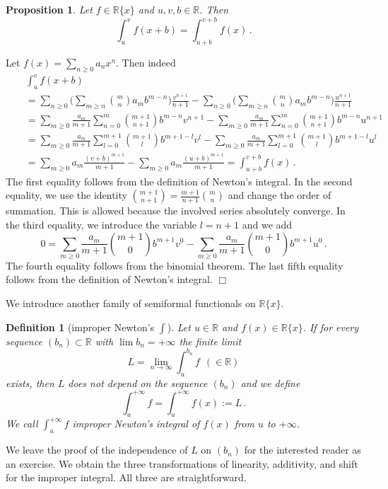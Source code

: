 \documentclass[10pt]{article}
\def\R{\mathbb{R}}
\def\proof{\par\noindent{\em Proof. }}
\def\eproof{\hfill{$\Box$}\bigskip}
\def\sus{\subset}
\newtheorem{prop}[thm]{Proposition}
\newtheorem{defi}[thm]{Definition}
\begin{document}
\begin{prop}\label{prop_shifInte3}
Let $f\in\R\{x\}$ and $u,v,b\in\R$. Then
$${\textstyle
\int_u^v f(x+b)=\int_{u+b}^{v+b} f(x)\,.
}
$$
\end{prop}
\proof
Let $f(x)=\sum_{n\ge0}a_nx^n$. Then indeed
\begin{eqnarray*}
&&{\textstyle
\int_u^v f(x+b)}\\
&&{\textstyle
=\sum_{n\ge0}\big(\sum_{m\ge n}\binom{m}{n}a_mb^{m-n}\big)\frac{v^{n+1}}{n+1}-\sum_{n\ge0}\big(\sum_{m\ge n}\binom{m}{n}a_mb^{m-n}\big)\frac{u^{n+1}}{n+1}}\\
&&={\textstyle
\sum_{m\ge0}\frac{a_m}{m+1}\sum_{n=0}^m\binom{m+1}{n+1}b^{m-n}v^{n+1}-
\sum_{m\ge0}\frac{a_m}{m+1}\sum_{n=0}^m\binom{m+1}{n+1}b^{m-n}u^{n+1}}\\
&&{\textstyle
=\sum_{m\ge0}\frac{a_m}{m+1}\sum_{l=0}^{m+1}\binom{m+1}{l}b^{m+1-l}v^l-
\sum_{m\ge0}\frac{a_m}{m+1}\sum_{l=0}^{m+1}\binom{m+1}{l}b^{m+1-l}u^l}\\
&&{\textstyle
=\sum_{m\ge0}a_m\frac{(v+b)^{m+1}}{m+1}-\sum_{m\ge0}a_m\frac{(u+b)^{m+1}}{m+1}=\int_{u+b}^{v+b} f(x)\,.}
\end{eqnarray*}
The first equality follows from the definition of Newton's integral. In 
the second equality, we use the identity $\binom{m+1}{n+1}=
\frac{m+1}{n+1}\binom{m}{n}$ and change the order of summation. This is
allowed because the involved series absolutely converge. In the third 
equality, we introduce the variable $l=n+1$ and we add  
$$
{\textstyle
0=\sum_{m\ge0}\frac{a_m}{m+1}\binom{m+1}{0}b^{m+1}v^0-
\sum_{m\ge0}\frac{a_m}{m+1}\binom{m+1}{0}b^{m+1}u^0\,.
}
$$  
The fourth equality follows from the binomial theorem. The last fifth 
equality follows from the definition of Newton's integral. 
\eproof

We introduce another family of semiformal functionals on 
$\R\{x\}$.  

\begin{defi}[improper Newton's $\int$]\label{def_imprNewtonInt}
Let $u\in\R$ and $f(x)\in\R\{x\}$. If for every sequence $(b_n)\sus\R$ with $\lim b_n=+\infty$ the finite limit 
$${\textstyle
L=\lim_{n\to\infty}\int_u^{b_n}f\ \ (\in\R)
}
$$
exists, then $L$ does not depend on the sequence $(b_n)$ and we define 
$$
{\textstyle
\int_u^{+\infty}f=\int_u^{+\infty}f(x):=L\,.
}
$$
We call $\int_u^{+\infty}f$ improper Newton's integral of $f(x)$ from $u$ to $+\infty$.
\end{defi}
We leave the proof of
the independence of $L$ on $(b_n)$ for the 
interested reader as an exercise. 
We obtain the three transformations of 
linearity, additivity, and shift for the improper integral. All three are straightforward. 
\end{document}
